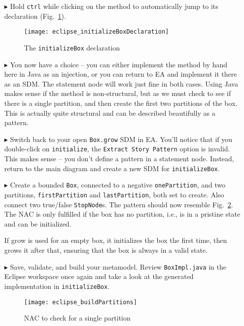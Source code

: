 \begin{itemize}
\item[$\blacktriangleright$] Hold \texttt{ctrl} while clicking on the method to automatically jump to its declaration (Fig.~\ref{fig:initBoxDecl}).

\begin{figure}[htp]
\begin{center}
  \texttt{[image: eclipse\_initializeBoxDeclaration]}
  \caption{The \texttt{initializeBox} declaration}
  \label{fig:initBoxDecl}
\end{center}
\end{figure}

\item[$\blacktriangleright$] You now have a choice -- you can either implement the method by hand here in Java as an injection, or you can return to
EA and implement it there as an SDM. The statement node will work just fine in both cases. Using Java makes sense if the method is non-structural, but
as we must check to see if there is a single partition, and then create the first two partitions of the box. This is actually quite structural and can be
described beautifully as a pattern.


 \item[$\blacktriangleright$] Switch back to your open \texttt{Box.grow} SDM in EA. You'll notice that if you double-click on \texttt{initialize}, the
 \texttt{Extract Story Pattern} option is invalid. This makes sense -- you don't define a pattern in a statement node. Instead, return to the main diagram and
 create a new SDM for \texttt{initializeBox}.
 
 \item[$\blacktriangleright$] Create a bounded \texttt{Box}, connected to a negative \texttt{onePartition}, and two partitions, \texttt{firstPartition} and
 \texttt{lastPartition}, both set to create. Also connect two true/false \texttt{StopNode}s. The pattern should now resemble Fig.~\ref{fig:buildPartitions}. The
 NAC is only fulfilled if the box has no partition, i.e., is in a pristine state and can be initialized.
 
 If grow is used for an empty box, it initializes the box the first time, then grows it after that, ensuring that the box is always in a valid state.
 
\item[$\blacktriangleright$] Save, validate, and build your metamodel. Review \texttt{BoxImpl.java} in the Eclipse workspace once again and take a look at the
generated implementation in \texttt{initializeBox}.
 
\newpage
 
 \vspace*{3cm}
 
 \begin{figure}[htp]
\begin{center}
  \texttt{[image: eclipse\_buildPartitions]}
  \caption{NAC to check for a single partition}
  \label{fig:buildPartitions}
\end{center}
\end{figure}


\end{itemize}
